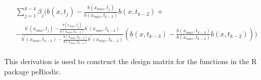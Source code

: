 \documentclass{article}
\begin{document}
\begin{equation}
\begin{aligned}
& \sum_{j=1}^{k-4}\beta_j \Biggl(b(x, t_j) -  \frac{b(x_{max}, t_j)}{ b(x_{max}, t_{k-2})} b(x, t_{k-2})+\\
& - \frac{b^{\prime}(x_{max}, t_j) -  \frac{b(x_{max}, t_j)}{ b(x_{max}, t_{k-2})} b^{\prime}(x_{max}, t_{k-2})}{b^{\prime}(x_{max}, t_{k-3}) -  \frac{b(x_{max}, t_{k-3})}{ b(x_{max}, t_{k-2})} b^{\prime}(x_{max}, t_{k-2})} \left(b(x, t_{k-3}) -  \frac{b(x_{max}, t_{k-3})}{ b(x_{max}, t_{k-2})} b(x, t_{k-2})\right) \Biggr) \\
\end{aligned}
\end{equation}

This derivation is used to construct the design matrix for the functions in the R package peRiodic.
\end{document}
